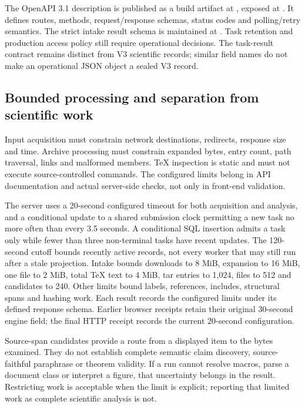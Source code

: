  The OpenAPI 3.1 description is published as a build artifact at , exposed at . It defines routes, methods, request/response schemas, status codes and polling/retry semantics. The strict intake result schema is maintained at . Task retention and production access policy still require operational decisions. The task-result contract remains distinct from V3 scientific records; similar field names do not make an operational JSON object a sealed V3 record.

\subsection{Bounded processing and separation from scientific work}

Input acquisition must constrain network destinations, redirects, response size and time. Archive processing must constrain expanded bytes, entry count, path traversal, links and malformed members. TeX inspection is static and must not execute source-controlled commands. The configured limits belong in API documentation and actual server-side checks, not only in front-end validation.

The server uses a 20-second configured timeout for both acquisition and analysis, and a conditional update to a shared submission clock permitting a new task no more often than every 3.5 seconds. A conditional SQL insertion admits a task only while fewer than three non-terminal tasks have recent updates. The 120-second cutoff bounds recently active records, not every worker that may still run after a stale projection. Intake bounds downloads to 8 MiB, expansion to 16 MiB, one file to 2 MiB, total TeX text to 4 MiB, tar entries to 1,024, files to 512 and candidates to 240. Other limits bound labels, references, includes, structural spans and hashing work. Each result records the configured limits under its defined response schema. Earlier browser receipts retain their original 30-second engine field; the final HTTP receipt records the current 20-second configuration.

Source-span candidates provide a route from a displayed item to the bytes examined. They do not establish complete semantic claim discovery, source-faithful paraphrase or theorem validity. If a run cannot resolve macros, parse a document class or interpret a figure, that uncertainty belongs in the result. Restricting work is acceptable when the limit is explicit; reporting that limited work as complete scientific analysis is not.

